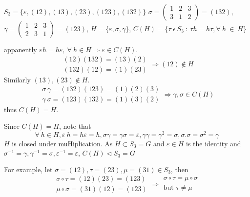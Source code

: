 \documentclass[11pt]{homework}
\newcommand{\fal}{\forall\ }
\begin{document}
\question
$S_3=\{\varepsilon,(12),(13),(23),(123),(132)\}$
$\sigma=\begin{pmatrix}1&2&3\\3&1&2\end{pmatrix}=(132)$, 
$\gamma=\begin{pmatrix}1&2&3\\2&3&1\end{pmatrix}=(123)$,
$H=\{\varepsilon,\sigma,\gamma\}$, $C(H)=\{\tau\ \epsilon\ S_3\ :\ \tau h=h\tau,\forall\ h\ \in\ H\}$
\begin{alphaparts}
    \questionpart appanently $\varepsilon h=h \varepsilon, \ \fal h\in H\Rightarrow\varepsilon\in C(H)$. 
    \[\begin{array}{cc}(12)(132)=(13)(2)\\(132)(12)=(1)(23)\end{array}\Rightarrow(12)\notin H\]
    Similarly $(13),(23)\notin H$.
    \[\begin{array}{cc}\sigma\ \gamma=(132)(123)=(1)(2)(3)\\\gamma\ \sigma=(123)(132)=(1)(3)(2)\end{array}\Rightarrow\gamma,\sigma\in C(H)\]
    thus $C(H)=H$.

    \questionpart Since $C(H)=H$, note that \
    \[\fal h\in H, \varepsilon\ h=h\varepsilon=h,\sigma\gamma=\gamma\sigma=\varepsilon, \gamma\gamma=\gamma^2=\sigma,\sigma.\sigma=\sigma^2=\gamma\]
    $H$ is closed under muHiplication. As $H \subset S_3=G$ and $\varepsilon\in H$ is the identity and $\sigma^{-1}=\gamma,\gamma^{-1}=\sigma,\varepsilon^{-1}=\varepsilon$, $C(H)\lhd S_3=G$
\end{alphaparts}

\question
For example, let $\sigma=(12),\tau=(23),\mu=(31)\in S_3$, then 
\[
    \begin{array}{cc}
        \sigma\circ\tau=(12)(23)=(123)\\
        \mu\circ\sigma=(31)(12)=(123)
    \end{array}\Rightarrow\begin{array}{cc}
        \sigma\circ\tau=\mu\circ\sigma
        \\\text{but }\tau\neq \mu
    \end{array}
\]
\end{document}
